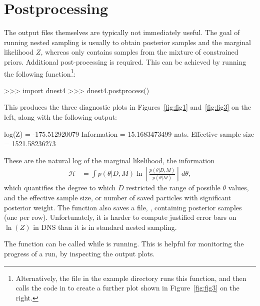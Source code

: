 \documentclass[article]{jss}
\begin{document}
\section{Postprocessing}\label{sec:postprocessing}
The output files themselves are typically not immediately useful.
The goal of running
nested sampling is usually to obtain posterior samples and the marginal likelihood $Z$,
whereas  only contains samples from the mixture of constrained
priors. Additional
post-processing is required. This can be achieved by running the following
 function\footnote{Alternatively, the file
 in the example directory runs this function, and then
calls the code in  to create a further plot shown in
Figure~\ref{fig:fig3} on the right.}:
%
\begin{CodeChunk}
\begin{CodeInput}
>>> import dnest4
>>> dnest4.postprocess()
\end{CodeInput}
\end{CodeChunk}
%
This produces the three diagnostic plots in Figures~\ref{fig:fig1}
and~\ref{fig:fig3} on the left, along with the following output:
%
\begin{CodeChunk}
\begin{CodeOutput}
log(Z) = -175.512920079
Information = 15.1683473499 nats.
Effective sample size = 1521.58236273
\end{CodeOutput}
\end{CodeChunk}
%
These are the natural log of the marginal likelihood, the
information
\begin{align*}
\mathcal{H} &= \int p(\theta|D, M)
\ln\left[\frac{p(\theta | D, M)}{p(\theta | M)}\right] \, d\theta,
\end{align*}
which quantifies the degree to which $D$ restricted the
range of possible $\theta$ values,
and the effective sample size,
or number of saved particles with significant posterior weight.
The  function also saves a file,
, containing posterior samples (one per row).
Unfortunately, it is harder to compute justified error bars on $\ln(Z)$
in DNS than it is in standard nested sampling.

The  function can be called while  is running.
This is helpful for monitoring the progress of a run, by inspecting the
output plots.
\end{document}
